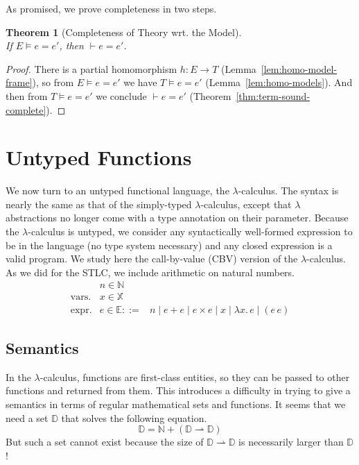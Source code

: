 \documentclass{tufte-handout}
\newcommand{\LAM}[1]{\lambda #1.\,}
\newcommand{\pto}[0]{\rightharpoonup}
\newcommand{\VAR}[0]{\mathbb{X}}
\newtheorem{theorem}{Theorem}%
\begin{document}
As promised, we prove completeness in two steps.

\begin{theorem}[Completeness of Theory wrt. the Model]\ \\
  If $E \models e = e'$, then $\vdash e = e'$.
\end{theorem}
\begin{proof}
  There is a partial homomorphism $h : E \to T$
  (Lemma~\ref{lem:homo-model-frame}), so from $E \models e = e'$ we
  have $T \models e = e'$ (Lemma~\ref{lem:homo-models}).  And then
  from $T \models e = e'$ we conclude $\vdash e = e'$
  (Theorem~\ref{thm:term-sound-complete}).
\end{proof}


\section{Untyped Functions}
\label{sec:lambda}


We now turn to an untyped functional language, the $\lambda$-calculus.
The syntax is nearly the same as that of the simply-typed
$\lambda$-calculus, except that $\lambda$ abstractions no longer come
with a type annotation on their parameter.  Because the
$\lambda$-calculus is untyped, we consider any syntactically
well-formed expression to be in the language (no type system
necessary) and any closed expression is a valid program.  We study
here the call-by-value (CBV) version of the $\lambda$-calculus.  As we
did for the STLC, we include arithmetic on natural numbers.
\[
\begin{array}{lrl}
              & n \in \mathbb{N} \\
 \text{vars.} & x \in \VAR\\
 \text{expr.}& e \in\mathbb{E} ::=& n \mid e + e \mid e \times e \mid x \mid \LAM{x} e \mid (e \, e)
\end{array}
\]

\subsection{Semantics}

In the $\lambda$-calculus, functions are first-class entities, so they
can be passed to other functions and returned from them. This
introduces a difficulty in trying to give a semantics in terms of
regular mathematical sets and functions. It seems that we need a set
$\mathbb{D}$ that solves the following equation.
\[
   \mathbb{D} = \mathbb{N} + (\mathbb{D} \pto \mathbb{D})
\]
But such a set cannot exist because the size of $\mathbb{D} \pto
\mathbb{D}$ is necessarily larger than $\mathbb{D}$!
\end{document}
